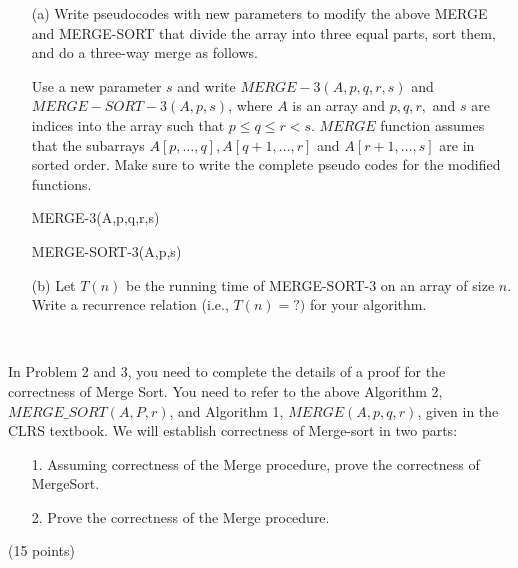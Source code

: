 \documentclass[12pt]{article}
\newcommand{\vs}{\vspace{2mm}}
\begin{document}
\begin{itemize}
\item[(a)] Write pseudocodes with new parameters to modify the above MERGE and MERGE-SORT  that divide the array into three equal parts, sort them, and do a three-way merge as follows. 

Use a new parameter $s$ and write 
   $MERGE-3(A, p, q, r, s)$ and $MERGE-SORT-3(A, p, s)$, where $A$ is an array and $p, q, r,$ and $s$ are indices into the array such that $p \leq q \leq r < s.$ $MERGE$ function assumes that the subarrays $A[p, \ldots, q], A[q+1, \ldots, r]$ and $A[r+1, \ldots, s]$ are in sorted order.
Make sure to write the complete pseudo codes for the modified functions.


\begin{algorithm}
\caption{MERGE-3(A,p,q,r,s)}
\begin{algorithmic}[1]
\end{algorithmic}
\end{algorithm}
\begin{algorithm}

\caption{MERGE-SORT-3(A,p,s)}
\begin{algorithmic}[1]
\end{algorithmic}
\end{algorithm}

\item[(b)] Let $T(n)$ be the running time of MERGE-SORT-3 on an array of size $n$. Write a recurrence relation (i.e., $T(n) = ? )$ for your algorithm. 
\end{itemize}
\vs\



In Problem 2 and 3, you need to complete the details  of a proof for the correctness of Merge Sort. You need to refer to the above Algorithm 2, $MERGE\_SORT(A,P,r)$,  and Algorithm 1, $MERGE(A,p,q,r)$, given in the CLRS textbook. We will establish correctness of Merge-sort in two parts:

\begin{itemize}
    
\item[1.] Assuming correctness of the Merge procedure, prove the correctness of MergeSort.
\item[2.] Prove the correctness of the  Merge procedure.

\end{itemize}
(15 points)
\end{document}
